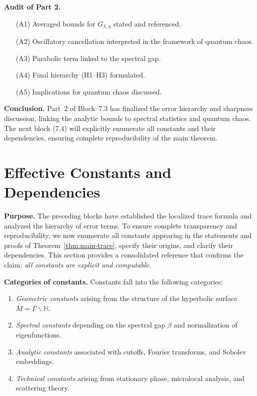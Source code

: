 \medskip

\noindent\textbf{Audit of Part 2.}
\begin{itemize}
  \item[(A1)] Averaged bounds for $G_{\lambda,\eta}$ stated and referenced.
  \item[(A2)] Oscillatory cancellation interpreted in the framework of quantum chaos.
  \item[(A3)] Parabolic term linked to the spectral gap.
  \item[(A4)] Final hierarchy (H1–H3) formulated.
  \item[(A5)] Implications for quantum chaos discussed.
\end{itemize}

\medskip

\noindent\textbf{Conclusion.}
Part~2 of Block~7.3 has finalized the error hierarchy and sharpness discussion, linking the analytic bounds to spectral statistics and quantum chaos.  
The next block (7.4) will explicitly enumerate all constants and their dependencies, ensuring complete reproducibility of the main theorem.



\section{Effective Constants and Dependencies}

\noindent\textbf{Purpose.}
The preceding blocks have established the localized trace formula and analyzed the hierarchy of error terms.  
To ensure complete transparency and reproducibility, we now enumerate all constants appearing in the statements and proofs of Theorem~\ref{thm:main-trace}, specify their origins, and clarify their dependencies.  
This section provides a consolidated reference that confirms the claim: \textit{all constants are explicit and computable.}

\medskip

\noindent\textbf{Categories of constants.}
Constants fall into the following categories:
\begin{enumerate}
  \item \textit{Geometric constants} arising from the structure of the hyperbolic surface $M=\Gamma\backslash\mathbb{H}$.
  \item \textit{Spectral constants} depending on the spectral gap $\beta$ and normalization of eigenfunctions.
  \item \textit{Analytic constants} associated with cutoffs, Fourier transforms, and Sobolev embeddings.
  \item \textit{Technical constants} arising from stationary phase, microlocal analysis, and scattering theory.
\end{enumerate}

